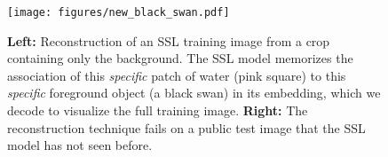\begin{figure}[t]
    \centering
    \texttt{[image: figures/new\_black\_swan.pdf]}
    \caption{\textbf{Left:} Reconstruction of an SSL training image from a crop containing only the background. The SSL model memorizes the association of this \emph{specific} patch of water (pink square) to this \emph{specific} foreground object (a black swan) in its embedding, which we decode to visualize the full training image. \textbf{Right:} The reconstruction technique fails on a public test image that the SSL model has not seen before.}
    \label{fig:black_swan}
\end{figure}